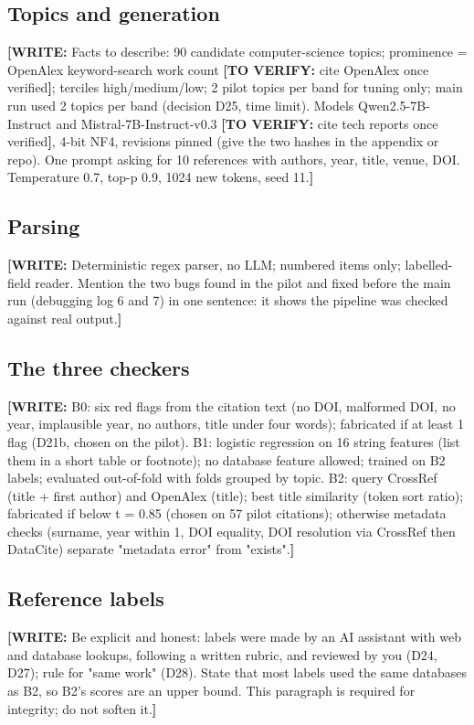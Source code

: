 \documentclass[10pt,twocolumn]{article}
\newcommand{\writeit}[1]{\textcolor{red!70!black}{\textbf{[WRITE:} #1\textbf{]}}}
\newcommand{\tv}[1]{\textcolor{orange!80!black}{\textbf{[TO VERIFY:} #1\textbf{]}}}
\begin{document}
\subsection{Topics and generation}
\writeit{Facts to describe: 90 candidate computer-science topics; prominence = OpenAlex keyword-search work count \tv{cite OpenAlex once verified}; terciles high/medium/low; 2 pilot topics per band for tuning only; main run used 2 topics per band (decision D25, time limit). Models Qwen2.5-7B-Instruct and Mistral-7B-Instruct-v0.3 \tv{cite tech reports once verified}, 4-bit NF4, revisions pinned (give the two hashes in the appendix or repo). One prompt asking for 10 references with authors, year, title, venue, DOI. Temperature 0.7, top-p 0.9, 1024 new tokens, seed 11.}
\subsection{Parsing}
\writeit{Deterministic regex parser, no LLM; numbered items only; labelled-field reader. Mention the two bugs found in the pilot and fixed before the main run (debugging log 6 and 7) in one sentence: it shows the pipeline was checked against real output.}
\subsection{The three checkers}
\writeit{B0: six red flags from the citation text (no DOI, malformed DOI, no year, implausible year, no authors, title under four words); fabricated if at least 1 flag (D21b, chosen on the pilot).
B1: logistic regression on 16 string features (list them in a short table or footnote); no database feature allowed; trained on B2 labels; evaluated out-of-fold with folds grouped by topic.
B2: query CrossRef (title + first author) and OpenAlex (title); best title similarity (token sort ratio); fabricated if below t = 0.85 (chosen on 57 pilot citations); otherwise metadata checks (surname, year within 1, DOI equality, DOI resolution via CrossRef then DataCite) separate "metadata error" from "exists".}
\subsection{Reference labels}
\writeit{Be explicit and honest: labels were made by an AI assistant with web and database lookups, following a written rubric, and reviewed by you (D24, D27); rule for "same work" (D28). State that most labels used the same databases as B2, so B2's scores are an upper bound. This paragraph is required for integrity; do not soften it.}
\end{document}
